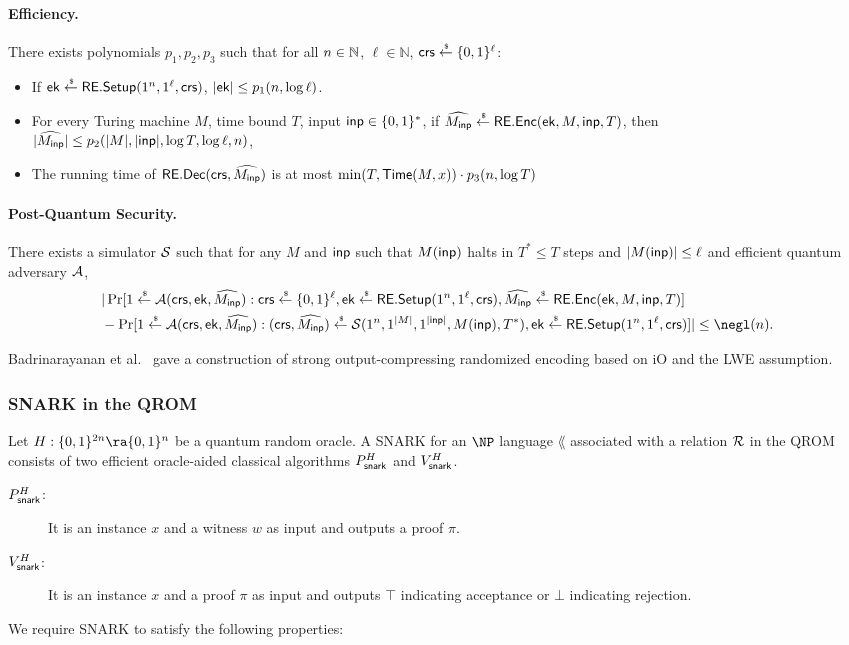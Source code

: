 \paragraph{Efficiency.}
There exists polynomials $p_1,p_2,p_3$ such that for all $n\in \mathbb{N}$, $\ell\in \mathbb{N}$, $\mathsf{crs}\overset{\hspace{0.1em}\mathsf{\scriptscriptstyle\$}}{\leftarrow} \{0,1\}^{\ell}$:
\begin{itemize}
    \item If $\mathsf{ek}\overset{\hspace{0.1em}\mathsf{\scriptscriptstyle\$}}{\leftarrow} \mathsf{RE}.\mathsf{Setup}(1^n,1^\ell,\mathsf{crs})$, $|\mathsf{ek}|\leq p_1(n, \log \ell)$.
    \item For every Turing machine $M$, time bound $T$, input $\mathsf{inp}\in \{0,1\}^{*}$, if  $\widehat{M_{\mathsf{inp}}}\overset{\hspace{0.1em}\mathsf{\scriptscriptstyle\$}}{\leftarrow}\mathsf{RE}.\mathsf{Enc}(\mathsf{ek},M,\mathsf{inp},T)$, then $|\widehat{M_{\mathsf{inp}}}|\leq p_2(|M|,|\mathsf{inp}|,\log T, \log \ell, n)$,
    \item The running time of $\mathsf{RE}.\mathsf{Dec}(\mathsf{crs},\widehat{M_{\mathsf{inp}}})$ is at most $\min(T,\mathsf{Time}(M,x))\cdot p_3(n,\log T)$
\end{itemize}

\paragraph{Post-Quantum Security.}

There exists a simulator $\mathcal{S}$ such that for any $M$ and $\mathsf{inp}$ such that $M(\mathsf{inp})$ halts in $T^*\leq T$ steps and $|M(\mathsf{inp})|\leq \ell$ and efficient quantum adversary $\mathcal{A}$,
\begin{align*}
    &|\Pr[1 \sample \A(\crs,\ek,\Menc):\crs\sample \bit^{\ell},\ek\sample\rsetup(1^\secpar,1^\ell,\crs),\Menc\sample\renc(\ek,M,\inp,T)]\\
    &-\Pr[1 \sample \A(\crs,\ek,\Menc):(\crs,\Menc)\sample \calS(1^{\secpar},1^{|M|},1^{|\inp|},M(\inp),T^*),\ek\sample\rsetup(1^\secpar,1^\ell,\crs)]|\leq \negl(\secpar).
\end{align*}

Badrinarayanan et al.~\cite{AC:BFKSW19} gave a construction of strong output-compressing randomized encoding based on iO and the LWE assumption. 

\subsubsection{SNARK in the QROM}
Let $H:\bit^{2\secpar}\ra \bit^{\secpar}$ be a quantum random oracle.
A SNARK for an $\NP$ language $\lang$ associated with a relation $\mathcal{R}$ in the QROM consists of two efficient oracle-aided classical algorithms $P_{\mathsf{snark}}^H$ and $V_{\mathsf{snark}}^H$.
\begin{description}
\item[$P_{\mathsf{snark}}^H$:] It is an instance $x$ and a witness $w$ as input and outputs a proof $\pi$.
\item[$V_{\mathsf{snark}}^H$:] It is an instance $x$ and a proof $\pi$ as input and outputs $\top$ indicating acceptance or $\bot$ indicating rejection.
\end{description}
We require SNARK to satisfy the following properties:


